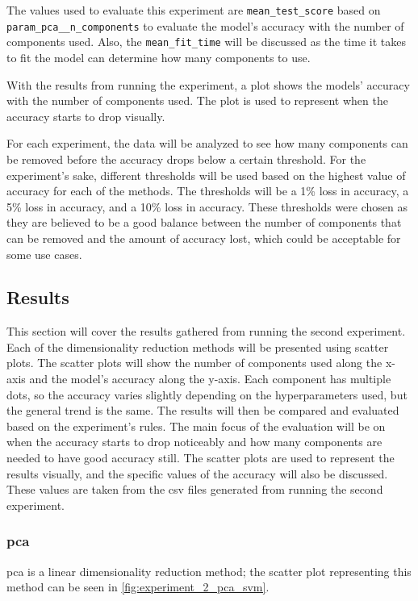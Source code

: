 The values used to evaluate this experiment are \texttt{mean\_test\_score} based on \texttt{param\_pca\_\_n\_components} to evaluate the model's accuracy with the number of components used. Also, the \texttt{mean\_fit\_time} will be discussed as the time it takes to fit the model can determine how many components to use.

With the results from running the experiment, a plot shows the models' accuracy with the number of components used. The plot is used to represent when the accuracy starts to drop visually.

For each experiment, the data will be analyzed to see how many components can be removed before the accuracy drops below a certain threshold. For the experiment's sake, different thresholds will be used based on the highest value of accuracy for each of the methods. The thresholds will be a 1\% loss in accuracy, a 5\% loss in accuracy, and a 10\% loss in accuracy. These thresholds were chosen as they are believed to be a good balance between the number of components that can be removed and the amount of accuracy lost, which could be acceptable for some use cases.


\subsection{Results}\label{subsec:experiment_2_results}
This section will cover the results gathered from running the second experiment. Each of the dimensionality reduction methods will be presented using scatter plots. The scatter plots will show the number of components used along the x-axis and the model's accuracy along the y-axis. Each component has multiple dots, so the accuracy varies slightly depending on the hyperparameters used, but the general trend is the same. The results will then be compared and evaluated based on the experiment's rules. The main focus of the evaluation will be on when the accuracy starts to drop noticeably and how many components are needed to have good accuracy still. The scatter plots are used to represent the results visually, and the specific values of the accuracy will also be discussed. These values are taken from the csv files generated from running the second experiment.

\subsubsection{\gls{pca}}\label{subsubsec:experiment_2_pca}
\gls{pca} is a linear dimensionality reduction method; the scatter plot representing this method can be seen in \autoref{fig:experiment_2_pca_svm}.

